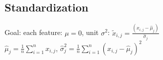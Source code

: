 
\subsection*{Standardization}
Goal: each feature: $\mu = 0$, unit $\sigma^2$: $\tilde{x}_{i,j} = \frac{(x_{i,j}-\hat{\mu}_j)}{\hat{\sigma}_j}$\\
$\hat{\mu}_j = \frac{1}{n}\sum_{i=1}^n x_{i,j}$, $\hat{\sigma}_j^2 = \frac{1}{n}\sum_{i=1}^n {(x_{i,j}-\hat{\mu}_j)}^2$ 





